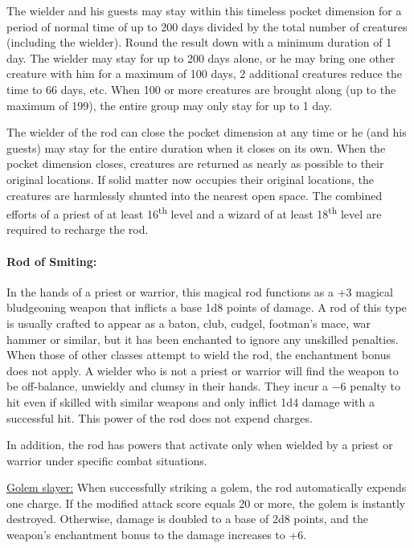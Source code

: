 \begin{multicols}{2}
The wielder and his guests may stay within this timeless pocket dimension for a period of normal time of up to 200 days divided by the total number of creatures (including the wielder).  Round the result down with a minimum duration of 1 day.  The wielder may stay for up to 200 days alone, or he may bring one other creature with him for a maximum of 100 days, 2 additional creatures reduce the time to 66 days, etc. When 100 or more creatures are brought along (up to the maximum of 199), the entire group may only stay for up to 1 day.  

The wielder of the rod can close the pocket dimension at any time or he (and his guests) may stay for the entire duration when it closes on its own.  When the pocket dimension closes, creatures are returned as nearly as possible to their original locations.  If solid matter now occupies their original locations, the creatures are harmlessly shunted into the nearest open space.  The combined efforts of a priest of at least 16\textsuperscript{th} level and a wizard of at least 18\textsuperscript{th} level are required to recharge the rod.

\paragraph{Rod of Smiting:} In the hands of a priest or warrior, this magical rod functions as a +3 magical bludgeoning weapon that inflicts a base 1d8 points of damage.  A rod of this type is usually crafted to appear as a baton, club, cudgel, footman's mace, war hammer or similar, but it has been enchanted to ignore any unskilled penalties.  When those of other classes attempt to wield the rod, the enchantment bonus does not apply.  A wielder who is not a priest or warrior will find the weapon to be off-balance, unwieldy and clumsy in their hands.  They incur a $-6$ penalty to hit even if skilled with similar weapons and only inflict 1d4 damage with a successful hit.  This power of the rod does not expend charges.  

In addition, the rod has powers that activate only when wielded by a priest or warrior under specific combat situations.

\underline{Golem slayer:} When successfully striking a golem, the rod automatically expends one charge.  If the modified attack score equals 20 or more, the golem is instantly destroyed.  Otherwise, damage is doubled to a base of 2d8 points, and the weapon's enchantment bonus to the damage increases to +6.  


\end{multicols}

